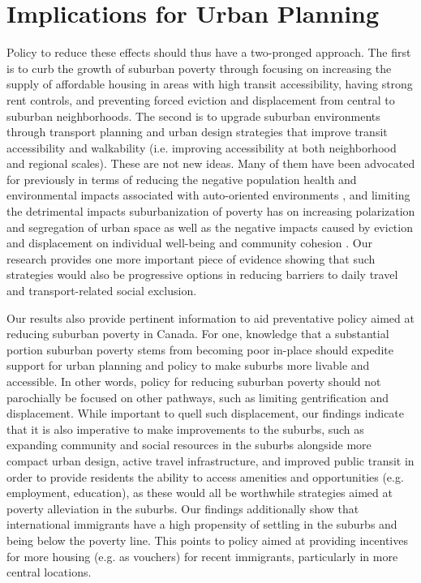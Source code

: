 \section{Implications for Urban Planning}

Policy to reduce these effects should thus have a two-pronged approach. The first is to curb the growth of suburban poverty through focusing on increasing the supply of affordable housing in areas with high transit accessibility, having strong rent controls, and preventing forced eviction and displacement from central to suburban neighborhoods. The second is to upgrade suburban environments through transport planning and urban design strategies that improve transit accessibility and walkability (i.e. improving accessibility at both neighborhood and regional scales). These are not new ideas. Many of them have been advocated for previously in terms of reducing the negative population health and environmental impacts associated with auto-oriented environments , and limiting the detrimental impacts suburbanization of poverty has on increasing polarization and segregation of urban space as well as the negative impacts caused by eviction and displacement on individual well-being and community cohesion  . Our research provides one more important piece of evidence showing that such strategies would also be progressive options in reducing barriers to daily travel and transport-related social exclusion.


Our results also provide pertinent information to aid preventative policy aimed at reducing suburban poverty in Canada. For one, knowledge that a substantial portion suburban poverty stems from becoming poor in-place should expedite support for urban planning and policy to make suburbs more livable and accessible. In other words, policy for reducing suburban poverty should not parochially be focused on other pathways, such as limiting gentrification and displacement. While important to quell such displacement, our findings indicate that it is also imperative to make improvements to the suburbs, such as expanding community and social resources in the suburbs alongside more compact urban design, active travel infrastructure, and improved public transit in order to provide residents the ability to access amenities and opportunities (e.g. employment, education), as these would all be worthwhile strategies aimed at poverty alleviation in the suburbs. Our findings additionally show that international immigrants have a high propensity of settling in the suburbs and being below the poverty line. This points to policy aimed at providing incentives for more housing (e.g. as vouchers) for recent immigrants, particularly in more central locations. 



